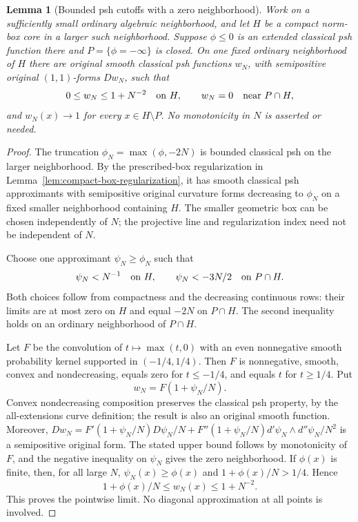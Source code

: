 \documentclass[11pt,a4paper]{article}
\numberwithin{equation}{section}
\newtheorem{lemma}[theorem]{Lemma}
\theoremstyle{definition}
\theoremstyle{remark}
\begin{document}
\begin{lemma}[Bounded psh cutoffs with a zero neighborhood]
\label{lem:r3-psh-zero-cutoffs}
Work on a sufficiently small ordinary algebraic neighborhood,
and let $H$ be a compact norm-box core in a larger such
neighborhood. Suppose $\phi\leq0$ is an extended classical
psh function there and $P=\{\phi=-\infty\}$ is closed.
On one fixed ordinary neighborhood of $H$ there are original
smooth classical psh functions $w_N$, with semipositive
original $(1,1)$-forms $Dw_N$, such that
\[
 0\leq w_N\leq1+N^{-2}\quad\hbox{on }H,\qquad
 w_N=0\quad\hbox{near }P\cap H,
\]
and $w_N(x)\to1$ for every $x\in H\setminus P$.
No monotonicity in $N$ is asserted or needed.
\end{lemma}

\begin{proof}
The truncation $\phi_N=\max(\phi,-2N)$ is bounded classical
psh on the larger neighborhood. By the prescribed-box
regularization in Lemma~\ref{lem:compact-box-regularization},
it has smooth classical psh approximants with semipositive
original curvature forms decreasing to
$\phi_N$ on a fixed smaller neighborhood containing $H$.
The smaller geometric box can be chosen independently of
$N$; the projective line and regularization index need
not be independent of $N$.

Choose one approximant $\psi_N\geq\phi_N$ such that
\[
 \psi_N<N^{-1}\quad\hbox{on }H,\qquad
 \psi_N<-3N/2\quad\hbox{on }P\cap H.
\]
Both choices follow from compactness and the decreasing
continuous rows: their limits are at most zero on $H$
and equal $-2N$ on $P\cap H$. The second inequality
holds on an ordinary neighborhood of $P\cap H$.

Let $F$ be the convolution of $t\mapsto\max(t,0)$ with
an even nonnegative smooth probability kernel supported
in $(-1/4,1/4)$. Then $F$ is nonnegative, smooth, convex
and nondecreasing, equals zero for $t\leq-1/4$, and
equals $t$ for $t\geq1/4$. Put
\[
 w_N=F(1+\psi_N/N).
\]
Convex nondecreasing composition preserves the classical
psh property, by the all-extensions curve definition;
the result is also an original smooth function. Moreover,
$Dw_N=F'(1+\psi_N/N)D\psi_N/N+
F''(1+\psi_N/N)d'\psi_N\wedge d''\psi_N/N^2$
is a semipositive original form.
The stated upper bound follows by monotonicity of $F$,
and the negative inequality on $\psi_N$ gives the zero
neighborhood. If $\phi(x)$ is finite, then, for all large
$N$, $\psi_N(x)\geq\phi(x)$ and
$1+\phi(x)/N>1/4$. Hence
\[
 1+\phi(x)/N\leq w_N(x)\leq1+N^{-2}.
\]
This proves the pointwise limit. No diagonal approximation
at all points is involved.
\end{proof}
\end{document}
